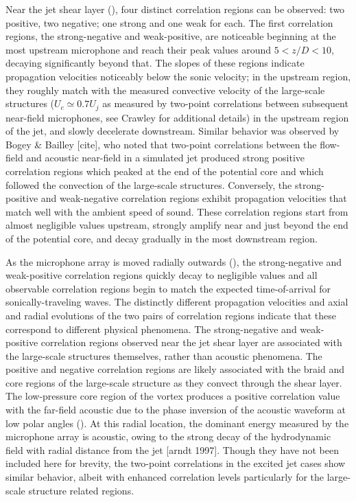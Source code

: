 Near the jet shear layer (), four distinct correlation regions can be observed: two positive, two negative; one strong and one weak for each. 
The first correlation regions, the strong-negative and weak-positive, are noticeable beginning at the most upstream microphone and reach their peak values around $5 < z/D < 10$, decaying significantly beyond that.
The slopes of these regions indicate propagation velocities noticeably below the sonic velocity; in the upstream region, they roughly match with the measured convective velocity of the large-scale structures ($U_c \simeq 0.7 U_j$ as measured by two-point correlations between subsequent near-field microphones, see Crawley \etal [cite] for additional details) in the upstream region of the jet, and slowly decelerate downstream.
Similar behavior was observed by Bogey \& Bailley [cite], who noted that two-point correlations between the flow-field and acoustic near-field in a simulated jet produced strong positive correlation regions which peaked at the end of the potential core and which followed the convection of the large-scale structures.
Conversely, the strong-positive and weak-negative correlation regions exhibit propagation velocities that match well with the ambient speed of sound. 
These correlation regions start from almost negligible values upstream, strongly amplify near and just beyond the end of the potential core, and decay gradually in the most downstream region.

As the microphone array is moved radially outwards (), the strong-negative and weak-positive correlation regions quickly decay to negligible values and all observable correlation regions begin to match the expected time-of-arrival for sonically-traveling waves. 
The distinctly different propagation velocities and axial and radial evolutions of the two pairs of correlation regions indicate that these correspond to different physical phenomena.
The strong-negative and weak-positive correlation regions observed near the jet shear layer are associated with the large-scale structures themselves, rather than acoustic phenomena. 
The positive and negative correlation regions are likely associated with the braid and core regions of the large-scale structure as they convect through the shear layer. 
The low-pressure core region of the vortex produces a positive correlation value with the far-field acoustic due to the phase inversion of the acoustic waveform at low polar angles (). 
At this radial location, the dominant energy measured by the microphone array is acoustic, owing to the strong decay of the hydrodynamic field with radial distance from the jet [arndt 1997].
Though they have not been included here for brevity, the two-point correlations in the excited jet cases show similar behavior, albeit with enhanced correlation levels particularly for the large-scale structure related regions. 

